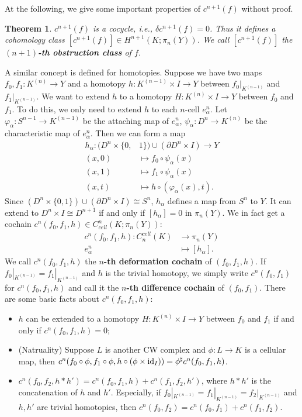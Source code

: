 \documentclass[12pt,a4paper]{article}
\newtheorem{theorem}{\indent Theorem}%
\theoremstyle{definition}
\newcommand{\id}{{\rm id}}
\newcommand{\p}{\partial}
\begin{document}
At the following, we give some important properties of $c^{n+1}(f)$ without 
proof. 
\begin{theorem}
    $c^{n+1}(f)$ is a cocycle, i.e., $\delta c^{n+1}(f) = 0$. Thus it 
    defines a cohomology class $[c^{n+1}(f)]\in H^{n+1}(K;\pi_{n}(Y))$. 
    We call $[c^{n+1}(f)]$ the \textbf{$(n+1)$-th obstruction class} of $f$.
\end{theorem}

A similar concept is defined for homotopies. Suppose we have two maps
$f_0,f_1:K^{(n)}\to Y$ and a homotopy $h:K^{(n-1)}\times I\to Y$ between
$f_0|_{K^{(n-1)}}$ and $f_1|_{K^{(n-1)}}$. We want to extend $h$ to a 
homotopy $H:K^{(n)}\times I\to Y$ between $f_0$ and $f_1$. To do this, 
we only need to extend $h$ to each $n$-cell $e_\alpha^n$. Let 
$\varphi_\alpha:S^{n-1}\to K^{(n-1)}$ be the attaching map of $e_\alpha^n$, 
$\psi_\alpha:D^n\to K^{(n)}$ be the characteristic map of $e_\alpha^n$. Then 
we can form a map
\begin{align*}
    h_\alpha:(D^n\times \{0,&1\})\cup(\p D^n\times I)\to Y \\ 
    (x,0)&\mapsto f_0\circ \psi_\alpha(x) \\
    (x,1)&\mapsto f_1\circ \psi_\alpha(x) \\
    (x,t)&\mapsto h\circ (\varphi_\alpha(x),t).
\end{align*}
Since $(D^n\times \{0,1\})\cup(\p D^n\times I)\cong S^n$, $h_\alpha$ defines
a map from $S^n$ to $Y$. It can extend to $D^n\times I\cong D^{n+1}$ if and 
only if $[h_\alpha] = 0$ in $\pi_n(Y)$. We in fact get a cochain
$c^n(f_0,f_1,h)\in C^n_{cell}(K;\pi_n(Y))$:
\begin{align*}
    c^n(f_0,f_1,h):C_n^{cell}(K) & \to \pi_n(Y) \\
    e_\alpha^n & \mapsto [h_\alpha]. 
\end{align*} 
We call $c^n(f_0,f_1,h)$ the \textbf{$n$-th deformation cochain} of 
$(f_0,f_1,h)$. If $f_0|_{K^{(n-1)}} = f_1|_{K^{(n-1)}}$ and $h$ is the 
trivial homotopy, we simply write $c^n(f_0,f_1)$ for $c^n(f_0,f_1,h)$ and 
call it the \textbf{$n$-th difference cochain} of $(f_0,f_1)$. 
There are some basic facts about $c^n(f_0,f_1,h)$:
\begin{itemize}
    \item $h$ can be extended to a homotopy $H:K^{(n)}\times I\to Y$ between 
    $f_0$ and $f_1$ if and only if $c^n(f_0,f_1,h) = 0$; 
    \item (Natruality) Suppose $L$ is another CW complex and $\phi:L\to K$ 
    is a cellular map, then 
    $c^n(f_0\circ \phi,f_1\circ \phi,h\circ(\phi\times \id_I)) = 
    \phi^{\sharp}c^n(f_0,f_1,h)$.
    \item $c^n(f_0,f_2,h*h') = c^n(f_0,f_1,h) + c^n(f_1,f_2,h')$, where
    $h*h'$ is the concatenation of $h$ and $h'$. Especially, if 
    $f_0|_{K^{(n-1)}} = f_1|_{K^{(n-1)}} = f_2|_{K^{(n-1)}}$ and $h,h'$ are
    trivial homotopies, then $c^n(f_0,f_2) = c^n(f_0,f_1) + c^n(f_1,f_2)$.
\end{itemize}
\end{document}

